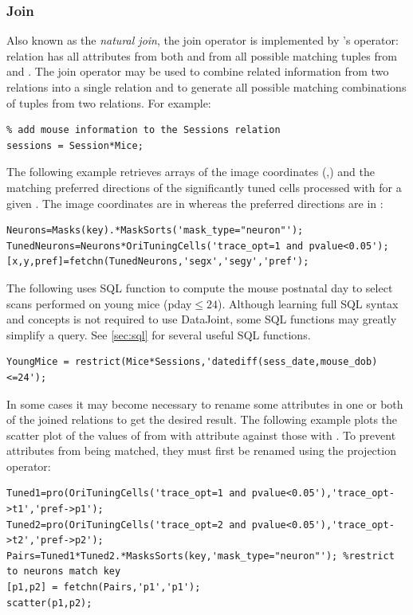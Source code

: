 \documentclass[10pt]{article}
\begin{document}
\subsubsection{Join}\label{sec:join}
Also known as the {\em natural join}, the join operator is implemented by 's  operator: relation  has all attributes from both  and  from all possible matching tuples from  and . The join operator may be used to combine related information from two relations into a single relation and to generate all possible matching combinations of tuples from two relations. For example:
\begin{lstlisting}
% add mouse information to the Sessions relation
sessions = Session*Mice;
\end{lstlisting}
The following example retrieves arrays of the image coordinates  (,) and the matching preferred directions  of the significantly tuned cells processed with  for a given . The image coordinates are in  whereas the preferred directions are in :
\begin{lstlisting}
Neurons=Masks(key).*MaskSorts('mask_type="neuron"'); 
TunedNeurons=Neurons*OriTuningCells('trace_opt=1 and pvalue<0.05');
[x,y,pref]=fetchn(TunedNeurons,'segx','segy','pref');
\end{lstlisting} 

The following uses SQL function  to compute the mouse postnatal day to select scans performed on young mice (pday$\le24$).  Although learning full SQL syntax and concepts is not required to use DataJoint, some SQL functions may greatly simplify a query. See \autoref{sec:sql} for several useful SQL functions.
\begin{lstlisting}
YoungMice = restrict(Mice*Sessions,'datediff(sess_date,mouse_dob)<=24');  
\end{lstlisting}   
In some cases it may become necessary to rename some attributes in one or both of the joined relations to get the desired result. The following example plots the scatter plot of the values of  from  with attribute  against those with .  To prevent attributes from being matched, they must first be renamed using the projection operator:
\begin{lstlisting}
Tuned1=pro(OriTuningCells('trace_opt=1 and pvalue<0.05'),'trace_opt->t1','pref->p1');
Tuned2=pro(OriTuningCells('trace_opt=2 and pvalue<0.05'),'trace_opt->t2','pref->p2');
Pairs=Tuned1*Tuned2.*MasksSorts(key,'mask_type="neuron"'); %restrict to neurons match key
[p1,p2] = fetchn(Pairs,'p1','p1'); 
scatter(p1,p2);
\end{lstlisting}
\end{document}
